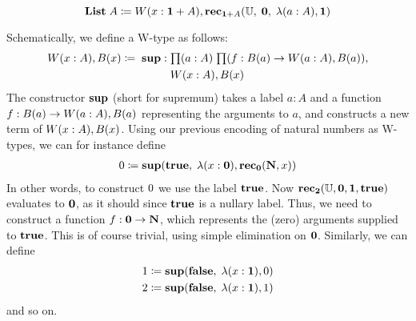 \[ \mathbf{List} \; A \coloneqq W(x:\mathbf{1} + A), \mathbf{rec}_{\mathbf{1} + A}(\mathbb{U}, \; \mathbf{0}, \; \lambda{(a:A)}, \mathbf{1}) \]

Schematically, we define a W-type as follows:
\begin{align*}
  \wtype{x:A} B(x) \defeq \; \supp : & \; \prd{a:A}{f : B(a) \to \wtype{a:A} B(a)} \\ & \; \wtype{x:A} B(x)         
\end{align*}
The constructor $\mathbf{sup}$ (short for supremum) takes a label $a : A$ and a function $f : B(a) \to W(a:A), B(a)$ representing the arguments to $a$, and constructs a new term of $W(x:A), B(x)$. Using our previous encoding of natural numbers as W-types, we can for instance define
\begin{align*}
0 \coloneqq \mathbf{sup}(\mathbf{true}, \; \lambda(x : \mathbf{0}), \mathbf{rec}_\mathbf{0}(\mathbf{N},x))
\end{align*}
In other words, to construct $0$ we use the label $\mathbf{true}$. Now $\mathbf{rec}_\mathbf{2}(\mathbb{U},\mathbf{0},\mathbf{1}, \mathbf{true})$ evaluates to $\mathbf{0}$, as it should since $\mathbf{true}$ is a nullary label. Thus, we need to construct a function $f : \mathbf{0} \to \mathbf{N}$, which represents the (zero) arguments supplied to $\mathbf{true}$. This is of course trivial, using simple elimination on $\mathbf{0}$. Similarly, we can define
\begin{align*}
1 \coloneqq \mathbf{sup}(\mathbf{false}, \; \lambda(x : \mathbf{1}), 0) \\
2 \coloneqq \mathbf{sup}(\mathbf{false}, \; \lambda(x : \mathbf{1}), 1)
\end{align*}
and so on.

